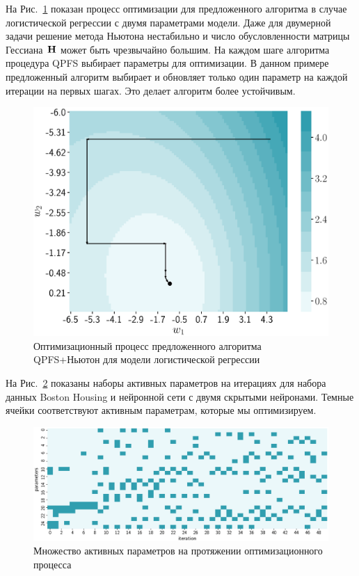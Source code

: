 На Рис.~\ref{ch3:fig:irls_qpfs_2d} показан процесс оптимизации для предложенного алгоритма в случае логистической регрессии с двумя параметрами модели. 
Даже для двумерной задачи решение метода Ньютона нестабильно и число обусловленности матрицы Гессиана~$\mathbf{H}$ может быть чрезвычайно большим. 
На каждом шаге алгоритма процедура QPFS выбирает параметры для оптимизации. 
В данном примере предложенный алгоритм выбирает и обновляет только один параметр на каждой итерации на первых шагах. 
Это делает алгоритм более устойчивым.

\begin{figure}[!ht]
	\centering
	\includegraphics[width=0.6\linewidth]{figs/ch3/irls_qpfs_2d}	 
	\caption{Оптимизационный процесс предложенного алгоритма QPFS+Ньютон для модели логистической регрессии}
	\label{ch3:fig:irls_qpfs_2d}
\end{figure}

На Рис.~\ref{ch3:fig:active_params_wrt_iters} показаны наборы активных параметров на итерациях для набора данных Boston Housing и нейронной сети с двумя скрытыми нейронами. 
Темные ячейки соответствуют активным параметрам, которые мы оптимизируем.
 
\begin{figure}[!ht]
	\centering
	\includegraphics[width=\linewidth]{figs/ch3/active_params_wrt_iters}	
	\caption{Множество активных параметров на протяжении оптимизационного процесса}
	\label{ch3:fig:active_params_wrt_iters}
\end{figure}

